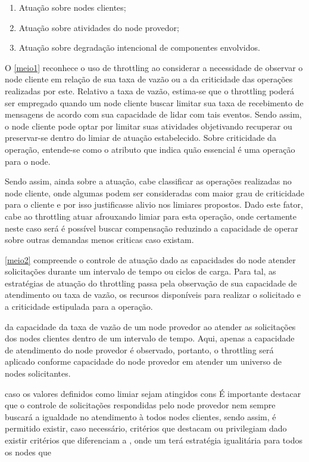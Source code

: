 \begin{enumerate}[label=(\subscript{Meio} {{\arabic*}})]
	\item \label{meio1} Atuação sobre nodes clientes; 
	\item \label{meio2} Atuação sobre atividades do node provedor;
	\item \label{meio3} Atuação sobre degradação intencional de componentes envolvidos.
\end{enumerate}

O \ref{meio1} reconhece o uso de throttling ao considerar a necessidade de observar o node cliente em relação de sua taxa de vazão ou a da criticidade das operações realizadas por este. Relativo a taxa de vazão, estima-se que o throttling poderá ser empregado quando um node cliente buscar limitar sua taxa de recebimento de mensagens de acordo com sua capacidade de lidar com tais eventos. Sendo assim, o node cliente pode optar por limitar suas atividades objetivando recuperar ou preservar-se dentro do limiar de atuação estabelecido. Sobre criticidade da operação, entende-se como o atributo que indica quão essencial é uma operação para o node. 

Sendo assim, ainda sobre a atuação, cabe classificar as operações realizadas no node cliente, onde algumas podem ser consideradas com maior grau de criticidade para o cliente e por isso justificasse alivio nos limiares propostos. Dado este fator, cabe ao throttling atuar afrouxando limiar para esta operação, onde certamente neste caso será é possível buscar compensação reduzindo a capacidade de operar sobre outras demandas menos criticas caso existam.

\ref{meio2} compreende o controle de atuação dado as capacidades do node atender solicitações durante um intervalo de tempo ou ciclos de carga. Para tal, as estratégias de atuação do throttling passa pela observação de sua capacidade de atendimento ou taxa de vazão, os recursos disponíveis para realizar o solicitado e a criticidade estipulada para a operação. 


  
   da capacidade da taxa de vazão de um node provedor ao atender as solicitações dos nodes clientes dentro de um intervalo de tempo.  Aqui, apenas a capacidade de atendimento do node provedor é observado, portanto, o throttling será aplicado conforme capacidade do node provedor em atender um universo de nodes solicitantes. 


 caso os valores definidos como limiar sejam atingidos cons É importante destacar que o controle de solicitações respondidas pelo node provedor nem sempre buscará a igualdade no atendimento à todos nodes clientes, sendo assim, é permitido existir, caso necessário, critérios que destacam ou privilegiam dado  existir critérios que diferenciam a , onde um terá  estratégia igualitária para todos os nodes que 


